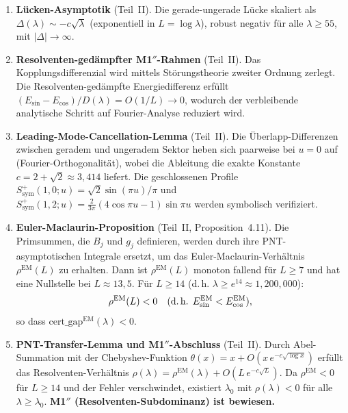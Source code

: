 \documentclass[12pt,a4paper]{article}
\theoremstyle{definition}
\theoremstyle{remark}
\begin{document}
\begin{enumerate}[label=\textbf{N\arabic*},leftmargin=3em]
  \item \textbf{Lücken-Asymptotik} (Teil~II). Die gerade-ungerade Lücke skaliert als $\Delta(\lambda) \sim -c\sqrt{\lambda}$ (exponentiell in $L = \log\lambda$), robust negativ für alle $\lambda \geq 55$, mit $|\Delta| \to \infty$.

  \item \textbf{Resolventen-gedämpfter M1$''$-Rahmen} (Teil~II). Das Kopplungsdifferenzial wird mittels Störungstheorie zweiter Ordnung zerlegt. Die Resolventen-gedämpfte Energiedifferenz erfüllt $(E_{\sin} - E_{\cos})/D(\lambda) = O(1/L) \to 0$, wodurch der verbleibende analytische Schritt auf Fourier-Analyse reduziert wird.

  \item \textbf{Leading-Mode-Cancellation-Lemma} (Teil~II). Die Überlapp-Differenzen zwischen geradem und ungeradem Sektor heben sich paarweise bei $u = 0$ auf (Fourier-Orthogonalität), wobei die Ableitung die exakte Konstante $c = 2 + \sqrt{2} \approx 3{,}414$ liefert. Die geschlossenen Profile $S^+_{\mathrm{sym}}(1,0;u) = \sqrt{2}\sin(\pi u)/\pi$ und $S^+_{\mathrm{sym}}(1,2;u) = \tfrac{2}{3\pi}(4\cos\pi u - 1)\sin\pi u$ werden symbolisch verifiziert.

  \item \textbf{Euler-Maclaurin-Proposition} (Teil~II, Proposition~4.11). Die Primsummen, die $B_j$ und $g_j$ definieren, werden durch ihre PNT-asymptotischen Integrale ersetzt, um das Euler-Maclaurin-Verhältnis $\rho^{\mathrm{EM}}(L)$ zu erhalten. Dann ist $\rho^{\mathrm{EM}}(L)$ monoton fallend für $L \geq 7$ und hat eine Nullstelle bei $L \approx 13{,}5$. Für $L \geq 14$ (d.\,h. $\lambda \geq e^{14} \approx 1{,}200{,}000$):
  \[
    \rho^{\mathrm{EM}}(L) < 0 \quad\text{(d.\,h. } E_{\sin}^{\mathrm{EM}} < E_{\cos}^{\mathrm{EM}}\text{)},
  \]
  so dass $\mathrm{cert\_gap}^{\mathrm{EM}}(\lambda) < 0$.

  \item \textbf{PNT-Transfer-Lemma und M1$''$-Abschluss} (Teil~II). Durch Abel-Summation mit der Chebyshev-Funktion $\theta(x) = x + O(x\,e^{-c\sqrt{\log x}})$ erfüllt das Resolventen-Verhältnis $\rho(\lambda) = \rho^{\mathrm{EM}}(\lambda) + O(L\,e^{-c\sqrt{L}})$. Da $\rho^{\mathrm{EM}} < 0$ für $L \geq 14$ und der Fehler verschwindet, existiert $\lambda_0$ mit $\rho(\lambda) < 0$ für alle $\lambda \geq \lambda_0$. \textbf{M1$''$ (Resolventen-Subdominanz) ist bewiesen.}
\end{enumerate}


\end{document}
